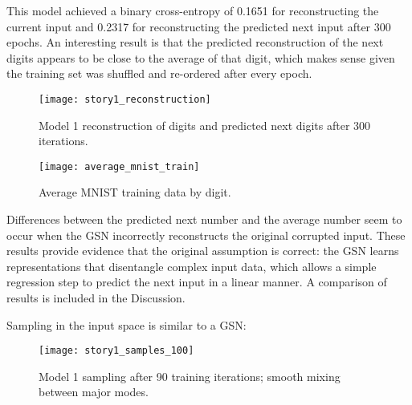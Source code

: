 This model achieved a binary cross-entropy of 0.1651 for reconstructing the current input  and 0.2317 for reconstructing the predicted next input after 300 epochs. An interesting result is that the predicted reconstruction of the next digits appears to be close to the average of that digit, which makes sense given the training set was shuffled and re-ordered after every epoch.

\begin{figure}[h!]
  \centering
    \texttt{[image: story1\_reconstruction]}
\caption{Model 1 reconstruction of digits and predicted next digits after 300 iterations.}
\end{figure}

\begin{figure}[h!]
  \centering
    \texttt{[image: average\_mnist\_train]}
\caption{Average MNIST training data by digit.}
\end{figure}

Differences between the predicted next number and the average number seem to occur when the GSN incorrectly reconstructs the original corrupted input. These results provide evidence that the original assumption is correct: the GSN learns representations that disentangle complex input data, which allows a simple regression step to predict the next input in a linear manner. A comparison of results is included in the Discussion.

Sampling in the input space is similar to a GSN:
\begin{figure}[h!]
  \centering
    \texttt{[image: story1\_samples\_100]}
\caption{Model 1 sampling after 90 training iterations; smooth mixing between major modes.}
\end{figure}

